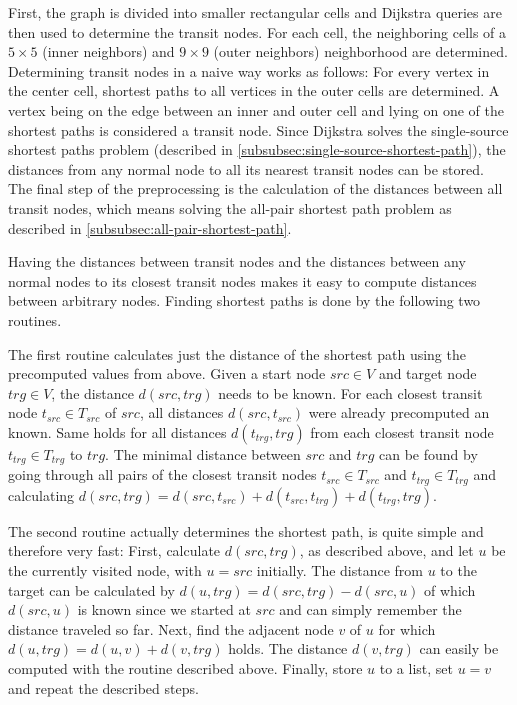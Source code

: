 			First, the graph is divided into smaller rectangular cells and Dijkstra queries are then used to determine the transit nodes.
			For each cell, the neighboring cells of a $5 \times 5$ (inner neighbors) and $9 \times 9$ (outer neighbors) neighborhood are determined.
			Determining transit nodes in a naive way works as follows:
			For every vertex in the center cell, shortest paths to all vertices in the outer cells are determined.
			A vertex being on the edge between an inner and outer cell and lying on one of the shortest paths is considered a transit node.
			Since Dijkstra solves the single-source shortest paths problem (described in \cref{subsubsec:single-source-shortest-path}), the distances from any normal node to all its nearest transit nodes can be stored.
			The final step of the preprocessing is the calculation of the distances between all transit nodes, which means solving the all-pair shortest path problem as described in \cref{subsubsec:all-pair-shortest-path}.
			
			Having the distances between transit nodes and the distances between any normal nodes to its closest transit nodes makes it easy to compute distances between arbitrary nodes.
			Finding shortest paths is done by the following two routines.
			
			The first routine calculates just the distance of the shortest path using the precomputed values from above.
			Given a start node $src \in V$ and target node $trg \in V$, the distance $d(src, trg)$ needs to be known.
			For each closest transit node $t_{src} \in T_{src}$ of $src$, all distances $d(src, t_{src})$ were already precomputed an known.
			Same holds for all distances $d(t_{trg}, trg)$ from each closest transit node $t_{trg} \in T_{trg}$ to $trg$.
			The minimal distance between $src$ and $trg$ can be found by going through all pairs of the closest transit nodes $t_{src} \in T_{src}$ and $t_{trg} \in T_{trg}$ and calculating $d(src, trg) = d(src, t_{src}) + d(t_{src}, t_{trg}) + d(t_{trg}, trg)$.
			
			The second routine actually determines the shortest path, is quite simple and therefore very fast:
			First, calculate $d(src, trg)$, as described above, and let $u$ be the currently visited node, with $u = src$ initially.
			The distance from $u$ to the target can be calculated by $d(u, trg) = d(src, trg) - d(src, u)$ of which $d(src, u)$ is known since we started at $src$ and can simply remember the distance traveled so far.
			Next, find the adjacent node $v$ of $u$ for which $d(u, trg) = d(u, v) + d(v, trg)$ holds.
			The distance $d(v, trg)$ can easily be computed with the routine described above.
			Finally, store $u$ to a list, set $u = v$ and repeat the described steps.
			
